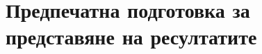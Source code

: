 ﻿\newpage
\chapter{Предпечатна подготовка за представяне на ресултатите}
\label{chapter11}
\thispagestyle{empty}

